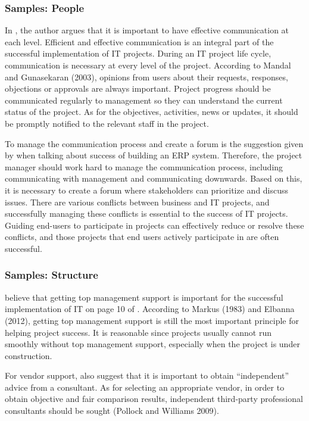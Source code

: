 \subsubsection{Samples: People}
In , the author argues that it is important to have effective communication at each level. Efficient and effective communication is an integral part of the successful implementation of IT projects. During an IT project life cycle, communication is necessary at every level of the project. According to Mandal and Gunasekaran (2003), opinions from users about their requests, responses, objections or approvals are always important. Project progress should be communicated regularly to management so they can understand the current status of the project. As for the objectives, activities, news or updates, it should be promptly notified to the relevant staff in the project.


To manage the communication process and create a forum is the suggestion given by \citeauthor{2} when talking about success of building an ERP system. Therefore, the project manager should work hard to manage the communication process, including communicating with management and communicating downwards. Based on this, it is necessary to create a forum where stakeholders can prioritize and discuss issues. There are various conflicts between business and IT projects, and successfully managing these conflicts is essential to the success of IT projects. Guiding end-users to participate in projects can effectively reduce or resolve these conflicts, and those projects that end users actively participate in are often successful.

\subsubsection{Samples: Structure}
\citeauthor{6} believe that getting top management support is important for the successful implementation of IT on page 10 of . According to Markus (1983) and Elbanna (2012), getting top management support is still the most important principle for helping project success. It is reasonable since projects usually cannot run smoothly without top management support, especially when the project is under construction.

For vendor support, \citeauthor{6} also suggest that it is important to obtain “independent” advice from a consultant. As for selecting an appropriate vendor, in order to obtain objective and fair comparison results, independent third-party professional consultants should be sought (Pollock and Williams 2009).

